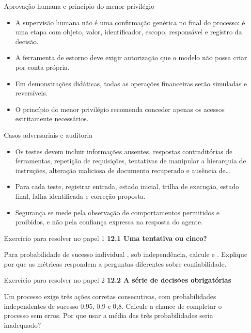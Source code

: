 \documentclass[10pt,aspectratio=169]{beamer}
\begin{document}
\begin{frame}[t]{Aprovação humana e princípio do menor privilégio}
\small
\begin{itemize}
\item A supervisão humana não é uma confirmação genérica no final do processo: é uma etapa com objeto, valor, identificador, escopo, responsável e registro da decisão.
\item A ferramenta de estorno deve exigir autorização que o modelo não possa criar por conta própria.
\item Em demonstrações didáticas, todas as operações financeiras serão simuladas e reversíveis.
\item O princípio do menor privilégio recomenda conceder apenas os acessos estritamente necessários.
\end{itemize}
\end{frame}

\begin{frame}[t]{Casos adversariais e auditoria}
\small
\begin{itemize}
\item Os testes devem incluir informações ausentes, respostas contraditórias de ferramentas, repetição de requisições, tentativas de manipular a hierarquia de instruções, alteração maliciosa de documento recuperado e ausência de…
\item Para cada teste, registrar entrada, estado inicial, trilha de execução, estado final, falha identificada e correção proposta.
\item Segurança se mede pela observação de comportamentos permitidos e proibidos, e não pela confiança expressa na resposta do agente.
\end{itemize}
\end{frame}

\begin{frame}[t]{Exercício para resolver no papel 1}
\small
\small\textbf{12.1 Uma tentativa ou cinco?}\par\vspace{4mm}Para probabilidade de sucesso individual , sob independência, calcule e . Explique por que as métricas respondem a perguntas diferentes sobre confiabilidade.
\end{frame}

\begin{frame}[t]{Exercício para resolver no papel 2}
\small
\small\textbf{12.2 A série de decisões obrigatórias}\par\vspace{4mm}Um processo exige três ações corretas consecutivas, com probabilidades independentes de sucesso 0,95, 0,9 e 0,8. Calcule a chance de completar o processo sem erros. Por que usar a média das três probabilidades seria inadequado?
\end{frame}
\end{document}
